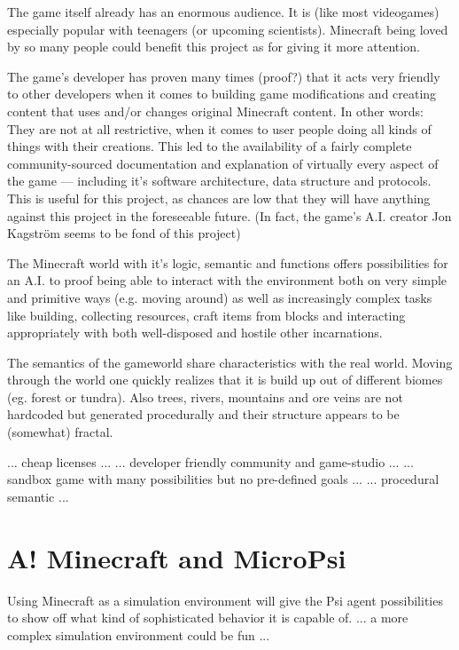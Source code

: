 The game itself already has an enormous audience. It is (like most videogames) especially popular with teenagers (or upcoming scientists). Minecraft being loved by so many people could benefit this project as for giving it more attention.

The game's developer has proven many times (proof?) that it acts very friendly to other developers when it comes to building game modifications and creating content that uses and/or changes original Minecraft content. In other words: They are not at all restrictive, when it comes to user people doing all kinds of things with their creations. This led to the availability of a fairly complete community-sourced  documentation and explanation of virtually every aspect of the game --- including it's software architecture, data structure and protocols. This is useful for this project, as chances are low that they will have anything against this project in the foreseeable future. (In fact, the game's A.I. creator Jon Kagström seems to be fond of this project)

The Minecraft world with it's logic, semantic and functions offers possibilities for an A.I. to proof being able to interact with the environment both on very simple and primitive ways (e.g. moving around) as well as increasingly complex tasks like building, collecting resources, craft items from blocks and interacting appropriately with both well-disposed and hostile other incarnations. %

The semantics of the gameworld share characteristics with the real world. Moving through the world one quickly realizes that it is build up out of different biomes (eg. forest or tundra). Also trees, rivers, mountains and ore veins are not hardcoded but generated procedurally and their structure appears to be (somewhat) fractal.
        
... cheap licenses ...
... developer friendly community and game-studio ...
... sandbox game with many possibilities but no pre-defined goals ...
... procedural semantic ...

    \section{A! Minecraft and MicroPsi}
Using Minecraft as a simulation environment will give the Psi agent possibilities to show off what kind of sophisticated behavior it is capable of.
... a more complex simulation environment could be fun ...